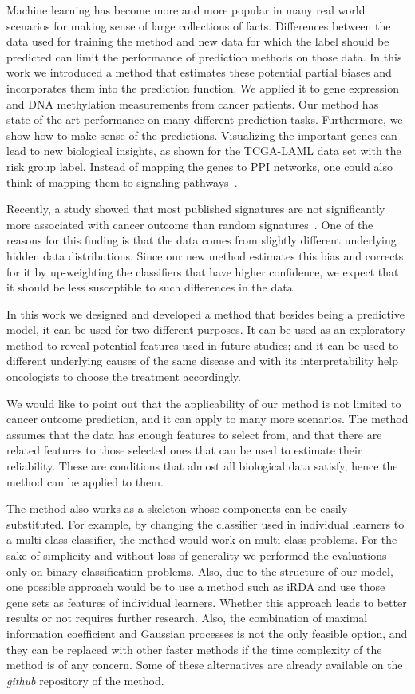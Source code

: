 Machine learning has become more and more popular in many real world scenarios for making sense of large collections of facts. Differences between the data used for training the method and new data for which the label should be predicted can limit the performance of prediction methods on those data. In this work we introduced a method that estimates these potential partial biases and incorporates them into the prediction function. We applied it to gene expression and DNA methylation measurements from cancer patients. Our method has state-of-the-art performance on many different prediction tasks. Furthermore, we show how to make sense of the predictions. Visualizing the important genes can lead to new biological insights, as shown for the TCGA-LAML data set with the risk group label. Instead of mapping the genes to PPI networks, one could also think of mapping them to signaling pathways~\cite{Kanehisa2014}.

Recently, a study showed that most published signatures are not significantly more associated with cancer outcome than random signatures~\cite{Venet2011}. One of the reasons for this finding is that the data comes from slightly different underlying hidden data distributions. Since our new method estimates this bias and corrects for it by up-weighting the classifiers that have higher confidence, we expect that it should be less susceptible to such differences in the data.

In this work we designed and developed a method that besides being a predictive model, it can be used for two different purposes. It can be used as an exploratory method to reveal potential features used in future studies; and it can be used to different underlying causes of the same disease and with its interpretability help oncologists to choose the treatment accordingly.

We would like to point out that the applicability of our method is not limited to cancer outcome prediction, and it can apply to many more scenarios. The method assumes that the data has enough features to select from, and that there are related features to those selected ones that can be used to estimate their reliability. These are conditions that almost all biological data satisfy, hence the method can be applied to them.

The method also works as a skeleton whose components can be easily
substituted. For example, by changing the classifier used in
individual learners to a multi-class classifier, the method would work
on multi-class problems. For the sake of simplicity and without loss
of generality we performed the evaluations only on binary
classification problems. Also, due to the structure of our model, one possible approach would be to use a method such as iRDA and use those gene sets as features of individual learners. Whether this approach leads to better results or not requires further research.
Also, the combination of maximal information coefficient and Gaussian
processes is not the only feasible option, and they can be replaced
with other faster methods if the time complexity of the method is of
any concern. Some of these alternatives are already available on the
\emph{github} repository of the method.

